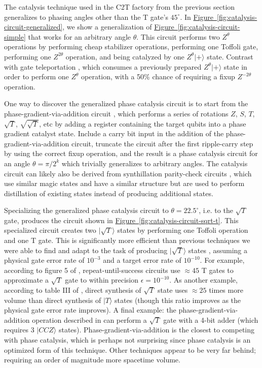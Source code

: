 \documentclass[superscriptaddress,notitlepage,longbibliography]{revtex4-1}
\newcommand{\fig}[1]{\hyperref[fig:#1]{Figure~\ref*{fig:#1}}}
\begin{document}
The catalysis technique used in the C2T factory from the previous section generalizes to phasing angles other than the T gate's $45^\circ$.
In \fig{catalysis-circuit-generalized}, we show a generalization of \fig{catalysis-circuit-simple} that works for an arbitrary angle $\theta$.
This circuit performs two $Z^\theta$ operations by performing cheap stabilizer operations, performing one Toffoli gate, performing one $Z^{2 \theta}$ operation, and being catalyzed by one $Z^\theta |+\rangle$ state.
Contrast with gate teleportation \cite{gottesman1999}, which consumes a previously prepared $Z^\theta |+\rangle$ state in order to perform one $Z^\theta$ operation, with a 50\% chance of requiring a fixup $Z^{-2 \theta}$ operation.

One way to discover the generalized phase catalysis circuit is to start from the phase-gradient-via-addition circuit \cite{kitaev2002, gidney2018, nam2018}, which performs a series of rotations $Z$, $S$, $T$, $\sqrt{T}$, $\sqrt{\sqrt{T}}$, etc by adding a register containing the target qubits into a phase gradient catalyst state.
Include a carry bit input in the addition of the phase-gradient-via-addition circuit, truncate the circuit after the first ripple-carry step by using the correct fixup operation, and the result is a phase catalysis circuit for an angle $\theta=\pi/2^k$ which trivially generalizes to arbitrary angles.
The catalysis circuit can likely also be derived from synthillation parity-check circuits \cite{campbell2018}, which use similar magic states and have a similar structure but are used to perform distillation of existing states instead of producing additional states.

Specializing the generalized phase catalysis circuit to $\theta = 22.5^{\circ}$, i.e. to the $\sqrt{T}$ gate, produces the circuit shown in \fig{catalysis-circuit-sqrt-t}.
This specialized circuit creates two $|\sqrt{T}\rangle$ states by performing one Toffoli operation and one T gate.
This is significantly more efficient than previous techniques we were able to find and adapt to the task of producing $|\sqrt{T}\rangle$ states \cite{landahl2013complex, bocharov2014, mishra2014, kitaev2002, gidney2018, nam2018}, assuming a physical gate error rate of $10^{-3}$ and a target error rate of $10^{-10}$.
For example, according to figure 5 of \cite{bocharov2014}, repeat-until-success circuits use $\approx 45$ T gates to approximate a $\sqrt{T}$ gate to within precision $\epsilon = 10^{-10}$.
As another example, according to table III of \cite{mishra2014}, direct synthesis of $\sqrt{T}$ state uses $\approx 25$ times more volume than direct synthesis of $|T\rangle$ states (though this ratio improves as the physical gate error rate improves).
A final example: the phase-gradient-via-addition operation described in \cite{kitaev2002,gidney2018} can perform a $\sqrt{T}$ gate with a 4-bit adder (which requires 3 $|CCZ\rangle$ states).
Phase-gradient-via-addition is the closest to competing with phase catalysis, which is perhaps not surprising since phase catalysis is an optimized form of this technique.
Other techniques appear to be very far behind; requiring an order of magnitude more spacetime volume.
\end{document}
